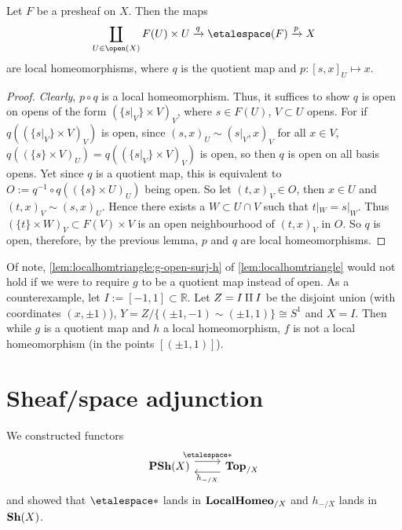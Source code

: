 \documentclass[../main.tex]{subfiles}
\begin{document}
\begin{lem}\label{lem:etalelocalhomeo}
    Let $F$ be a presheaf on \(X\). Then the maps
    \[\coprod_{U\in \open(X)} F(U)\times U \xrightarrow{q} \etalespace(F) \xrightarrow{p} X\]
    are local homeomorphisms, where $q$ is the quotient map and $p\colon [s, x]_U \mapsto x$. 
\end{lem}
\begin{proof}
    \emph{Clearly}, $p\circ q$ is a local homeomorphism. Thus, it suffices to show $q$ is open on opens of the form $(\{s|_V\}\times V)_V$, where $s\in F(U)$, $V\subset U$ opens. For if $q((\{s|_V\}\times V)_V)$ is open, since $(s,x)_U \sim (s|_V,x)_V$ for all $x\in V$, $q((\{s\}\times V)_U) = q((\{s|_V\}\times V)_V)$ is open, so then $q$ is open on all basis opens. Yet since $q$ is a quotient map, this is equivalent to $O:= q^{-1}\circ q((\{s\}\times U)_U)$ being open. So let $(t,x)_V\in O$, then $x\in U$ and $(t,x)_V\sim (s,x)_U$. Hence there exists a $W\subset U\cap V$ such that $t|_W = s|_W$. Thus $(\{t\}\times W)_V \subset F(V)\times V$ is an open neighbourhood of $(t,x)_V$ in $O$. So $q$ is open, therefore, by the previous lemma, $p$ and $q$ are local homeomorphisms.
\end{proof}

Of note, \cref{lem:localhomtriangle:g-open-surj-h} of \cref{lem:localhomtriangle} would not hold if we were to require $g$ to be a quotient map instead of open. As a counterexample, let $I:= [-1,1]\subset \mathbb{R}$. Let $Z = I\amalg I$ be the disjoint union (with coordinates $(x, \pm 1)$), $Y = Z / \{(\pm 1, -1) \sim (\pm 1, 1)\}\cong S^1$ and $X=I$. Then while $g$ is a quotient map and $h$ a local homeomorphism, $f$ is not a local homeomorphism (in the points $[(\pm 1, 1)]$). 

\section{Sheaf/space adjunction}
\noindent
We constructed functors
\begin{equation*}
  \begin{tikzcd}
    \catPresheaf(X) \ar[r, "{\etalespace*}"{name=leftadj}, shift left=2] & \catTopologicalSpace_{/X} \ar[l, "h_{-/X}"{name=rightadj}, shift left=2]
  \end{tikzcd}
\end{equation*}
and showed that $\etalespace*$ lands in $\mathbf{LocalHomeo}_{/X}$ and $h_{-/X}$ lands in $\operatorname{\mathbf{Sh}}(X)$.
\end{document}
